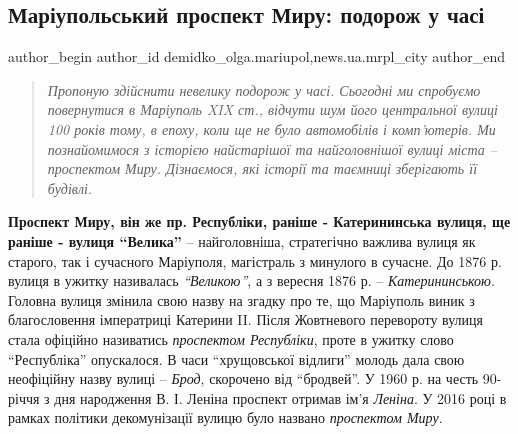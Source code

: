  
 
 
 
 
 
\subsection{Маріупольський проспект Миру: подорож у часі}
\label{sec:25_10_2018.stz.news.ua.mrpl_city.1.mrpl_prospekt_miru_podorozh_u_chasi}
 
\ifcmt
 author_begin
   author_id demidko_olga.mariupol,news.ua.mrpl_city
 author_end
\fi

\begin{quote}
\em Пропоную здійснити невелику подорож у часі. Сьогодні ми спробуємо повернутися в
Маріуполь XIX ст., відчути шум його центральної вулиці 100 років тому, в епоху,
коли ще не було автомобілів і комп'ютерів. Ми познайомимося з історією
найстарішої та найголовнішої вулиці міста – проспектом Миру. Дізнаємося, які
історії та таємниці зберігають її будівлі.
\end{quote}


\textbf{Проспект Миру, він же пр. Республіки, раніше - Катерининська вулиця, ще раніше
- вулиця \enquote{Велика}} – найголовніша, стратегічно важлива вулиця як старого, так і
сучасного Маріуполя, магістраль з минулого в сучасне. До 1876 р. вулиця в
ужитку називалась \emph{\enquote{Великою}}, а з вересня 1876 р. – \emph{Катерининською}. Головна
вулиця змінила свою назву на згадку про те, що Маріуполь виник з благословення
імператриці Катерини II. Після Жовтневого перевороту вулиця стала офіційно
називатись \emph{проспектом Республіки}, проте в ужитку слово \enquote{Республіка} опускалося.
В часи \enquote{хрущовської відлиги} молодь дала свою неофіційну назву вулиці – \emph{Брод},
скорочено від \enquote{бродвей}. У 1960 р. на честь 90-річчя з дня народження В. І.
Леніна проспект отримав ім'я \emph{Леніна}. У 2016 році в рамках політики
декомунізації вулицю було названо \emph{проспектом Миру}.

